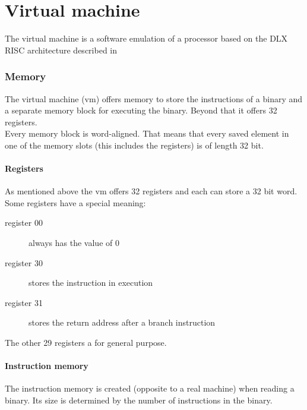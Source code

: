 \part{Virtual machine}
The virtual machine is a software emulation of a processor based on the DLX RISC
architecture described in \cite{wirth}
\section{Memory}
The virtual machine (vm) offers memory to store the instructions of a binary and
a separate memory block for executing the binary. Beyond that it offers 32
registers. \\
Every memory block is word-aligned. That means that every saved element in one
of the memory slots (this includes the registers) is of length 32 bit.
\subsection{Registers}
As mentioned above the vm offers 32 registers and each can store a 32 bit word.
Some registers have a special meaning: 
\begin{description}
  \item [register 00] always has the value of 0
  \item [register 30] stores the instruction in execution
  \item [register 31] stores the return address after a branch instruction
\end{description}
The other 29 registers a for general purpose.
\subsection{Instruction memory}
The instruction memory is created (opposite to a real machine) when reading a
binary. Its size is determined by the number of instructions in the binary. 
